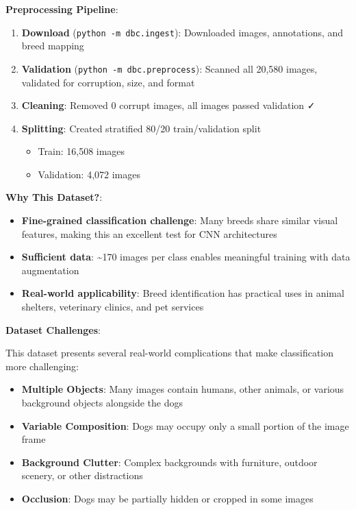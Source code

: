 \documentclass[
  letterpaper,
  DIV=11,
  numbers=noendperiod]{scrartcl}
\providecommand{\tightlist}{%
  \setlength{\itemsep}{0pt}\setlength{\parskip}{0pt}}
\begin{document}
\textbf{Preprocessing Pipeline}:

\begin{enumerate}
\def\labelenumi{\arabic{enumi}.}
\tightlist
\item
  \textbf{Download} (\texttt{python\ -m\ dbc.ingest}): Downloaded
  images, annotations, and breed mapping
\item
  \textbf{Validation} (\texttt{python\ -m\ dbc.preprocess}): Scanned all
  20,580 images, validated for corruption, size, and format
\item
  \textbf{Cleaning}: Removed 0 corrupt images, all images passed
  validation ✓
\item
  \textbf{Splitting}: Created stratified 80/20 train/validation split

  \begin{itemize}
  \tightlist
  \item
    Train: 16,508 images
  \item
    Validation: 4,072 images
  \end{itemize}
\end{enumerate}

\textbf{Why This Dataset?}:

\begin{itemize}
\tightlist
\item
  \textbf{Fine-grained classification challenge}: Many breeds share
  similar visual features, making this an excellent test for CNN
  architectures
\item
  \textbf{Sufficient data}: \textasciitilde170 images per class enables
  meaningful training with data augmentation
\item
  \textbf{Real-world applicability}: Breed identification has practical
  uses in animal shelters, veterinary clinics, and pet services
\end{itemize}

\textbf{Dataset Challenges}:

This dataset presents several real-world complications that make
classification more challenging:

\begin{itemize}
\tightlist
\item
  \textbf{Multiple Objects}: Many images contain humans, other animals,
  or various background objects alongside the dogs
\item
  \textbf{Variable Composition}: Dogs may occupy only a small portion of
  the image frame
\item
  \textbf{Background Clutter}: Complex backgrounds with furniture,
  outdoor scenery, or other distractions
\item
  \textbf{Occlusion}: Dogs may be partially hidden or cropped in some
  images
\end{itemize}
\end{document}
